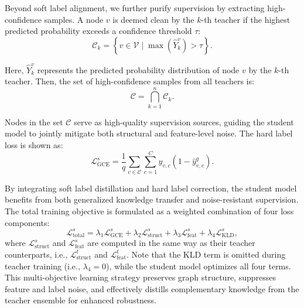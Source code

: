 \documentclass[sigconf, anonymous, review]{acmart}
\begin{document}
      Beyond soft label alignment, we further purify supervision by extracting high-confidence samples. A node $v$ is deemed clean by the $k$-th teacher if the highest predicted probability exceeds a confidence threshold $\tau$:
      \begin{equation}
        \mathcal{C}_k = \left\{ v \in \mathcal{V} \mid \max(\hat{Y}_k^{v}) > \tau \right\}.
      \end{equation}

      Here, $\hat{Y}_k^{v}$ represents the predicted probability distribution of node  $v$ by the $k$-th teacher. Then, the set of high-confidence samples from all teachers is:
      \begin{equation}
        \mathcal{C} = \bigcap_{k=1}^n \mathcal{C}_k.
      \end{equation}

      Nodes in the set $\mathcal{C}$ serve as high-quality supervision sources, guiding the student model to jointly mitigate both structural and feature-level noise. The hard label loss is shown as:
      \begin{equation}
        \mathcal{L}^s_{\text{GCE}} = \frac{1}{q} \sum_{v \in \mathcal{C}} \sum_{c=1}^C y_{v,c} \left(1 - \hat{y}_{v,c}^q\right).
      \end{equation}

      By integrating soft label distillation and hard label correction, the student model benefits from both generalized knowledge transfer and noise-resistant supervision. The total training objective is formulated as a weighted combination of four loss components:
      \begin{equation}
        \mathcal{L}^s_{\text{total}} = \lambda_1 \mathcal{L}^s_{\text{GCE}} + \lambda_2 \mathcal{L}^s_{\text{struct}} + \lambda_3 \mathcal{L}^s_{\text{feat}} + \lambda_4 \mathcal{L}^s_{\text{KLD}},
      \label{eq:loss}
      \end{equation}
      where $\mathcal{L}^s_{\text{struct}}$ and $\mathcal{L}^s_{\text{feat}}$ are computed in the same way as their teacher counterparts, i.e., $\mathcal{L}^t_{\text{struct}}$ and $\mathcal{L}^t_{\text{feat}}$. Note that the KLD term is omitted during teacher training (i.e., $\lambda_4 = 0$), while the student model optimizes all four terms. This multi-objective learning strategy preserves graph structure, suppresses feature and label noise, and effectively distills complementary knowledge from the teacher ensemble for enhanced robustness.
\end{document}
